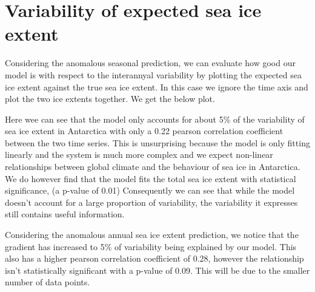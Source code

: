 \section{Variability of expected sea ice extent}
Considering the anomalous seasonal prediction, we can evaluate how good our model is with respect to the interannyal variability by plotting the expected sea ice extent against the true sea ice extent. In this case we ignore the time axis and plot the two ice extents together. We get the below plot.

Here wee can see that the model only accounts for about 5\% of the variability of sea ice extent in Antarctica with only a 0.22 pearson correlation coefficient between the two time series. This is unsurprising because the model is only fitting linearly and the system is much more complex and we expect non-linear relationships between global climate and the behaviour of sea ice in Antarctica. We do however find that the model fits the total sea ice extent with statistical significance, (a p-value of 0.01) Consequently we can see that while the model doesn't account for a large proportion of variability, the variability it expresses still contains useful information.

Considering the anomalous annual sea ice extent prediction, we notice that the gradient has increased to 5\% of variability being explained by our model. This also has a higher pearson correlation coefficient of 0.28, however the relationship isn't statistically significant with a p-value of 0.09. This will be due to the smaller number of data points. 